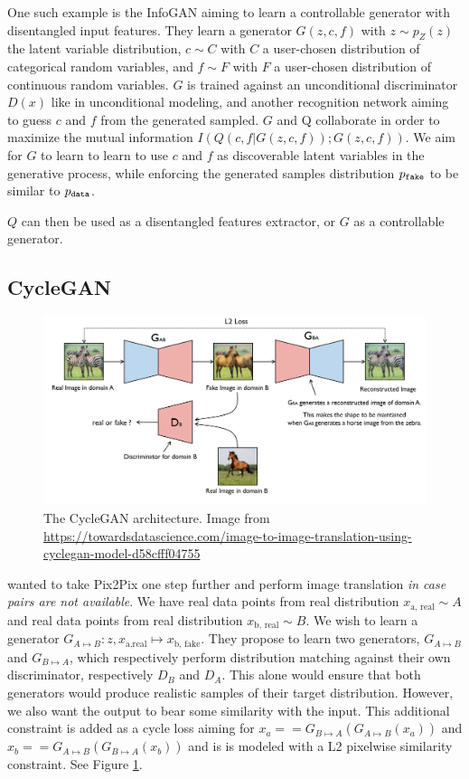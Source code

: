 One such example is the InfoGAN \citep{infogan} aiming to learn a controllable generator with disentangled input features. They learn a generator $G(z, c, f)$ with $z \sim p_Z(z)$ the latent variable distribution, $c \sim C$ with $C$ a user-chosen distribution of categorical random variables, and $f \sim F$ with $F$ a user-chosen distribution of continuous random variables. $G$ is trained against an unconditional discriminator $D(x)$ like in unconditional modeling, and another recognition network aiming to guess $c$ and $f$ from the generated sampled. $G$ and Q collaborate in order to maximize the mutual information $I(Q(c, f|G(z, c, f)); G(z, c, f))$. We aim for $G$ to learn to learn to use $c$ and $f$ as discoverable latent variables in the generative process, while enforcing the generated samples distribution $p_\texttt{fake}$ to be similar to $p_\texttt{data}$.

$Q$ can then be used as a disentangled features extractor, or $G$ as a controllable generator.

\subsection{CycleGAN}

\begin{figure}
    \centering
    \includegraphics[width=\columnwidth]{60-files/cyclegan.png}
    \caption{The CycleGAN architecture. Image from \url{https://towardsdatascience.com/image-to-image-translation-using-cyclegan-model-d58cfff04755}}
    \label{fig:cyclegan}
\end{figure}

\citet{cyclegan} wanted to take Pix2Pix one step further and perform image translation \emph{in case pairs are not available}. We have real data points from real distribution $x_\text{a, real} \sim A$ and  real data points from real distribution $x_\text{b, real} \sim B$. We wish to learn a generator $G_{A \mapsto B}: z, x_\text{a,real} \mapsto x_\text{b, fake}$. They propose to learn two generators, $G_{A \mapsto B}$ and $G_{B \mapsto A}$, which respectively perform distribution matching against their own discriminator, respectively $D_B$ and $D_A$. This alone would ensure that both generators would produce realistic samples of their target distribution. However, we also want the output to bear some similarity with the input. This additional constraint is added as a cycle loss aiming for $x_a == G_{B \mapsto A}(G_{A \mapsto B}(x_a))$ and $x_b == G_{A \mapsto B}(G_{B \mapsto A}(x_b))$ and is is modeled with a L2 pixelwise similarity constraint. See Figure \ref{fig:cyclegan}.

